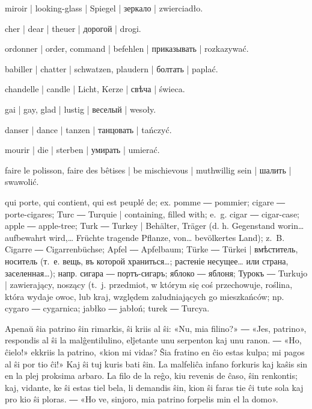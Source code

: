 \begin{ekzvocab}{1em}
 miroir | looking-glass | Spiegel | зеркало | zwierciadło.

 cher | dear | theuer | дорогой | drogi.

 ordonner | order, command | befehlen | приказывать | rozkazywać.

 babiller | chatter | schwatzen, plaudern | болтать | paplać.

 chandelle | candle | Licht, Kerze | свѣча | świeca.

 gai | gay, glad | lustig | веселый | wesoły.

 danser | dance | tanzen | танцовать | tańczyć.

 mourir | die | sterben | умирать | umierać.

 faire le polisson, faire des bêtises | be mischievous | muthwillig sein | шалить | swawolić.

 qui porte, qui contient, qui est peuplé de; ex.  pomme ―  pommier;  cigare ―  porte-cigares;  Turc ―  Turquie | containing, filled with; e.~g.  cigar ―  cigar-case;  apple ―  apple-tree;  Turk ―  Turkey | Behälter, Träger (d. h. Gegenstand worin\ldots{} aufbewahrt wird,\ldots{} Früchte tragende Pflanze, von\ldots{} bevölkertes Land); z.~B.  Cigarre ―  Cigarrenbüchse;  Apfel ―  Apfelbaum;  Türke ―  Türkei | вмѣститель, носитель (т.~е. вещь, въ которой храниться\ldots{}; растеніе несущее\ldots{} или страна, заселенная\ldots{}); напр.  сигара ―  портъ-сигаръ;  яблоко ―  яблоня;  Турокъ ― Turkujo  | zawierający, noszący (t.~j. przedmiot, w którym się coś przechowuje, roślina, która wydaje owoc, lub kraj, względem zaludniających go mieszkańców; np.  cygaro ―  cygarnica;  jabłko ―  jabłoń;  turek ―  Turcya.

\end{ekzvocab}


Apenaŭ ŝia patrino ŝin rimarkis, ŝi kriis al ŝi: «Nu, mia filino?» ― «Jes, patrino», respondis al ŝi la malĝentilulino, elĵetante unu serpenton kaj unu ranon. ― «Ho, ĉielo!» ekkriis la patrino, «kion mi vidas? Ŝia fratino en ĉio estas kulpa; mi pagos al ŝi por tio ĉi!» Kaj ŝi tuj kuris bati ŝin. La malfeliĉa infano forkuris kaj kaŝis sin en la plej proksima arbaro. La filo de la reĝo, kiu revenis de ĉaso, ŝin renkontis; kaj, vidante, ke ŝi estas tiel bela, li demandis ŝin, kion ŝi faras tie ĉi tute sola kaj pro kio ŝi ploras. ― «Ho ve, sinjoro, mia patrino forpelis min el la domo».

